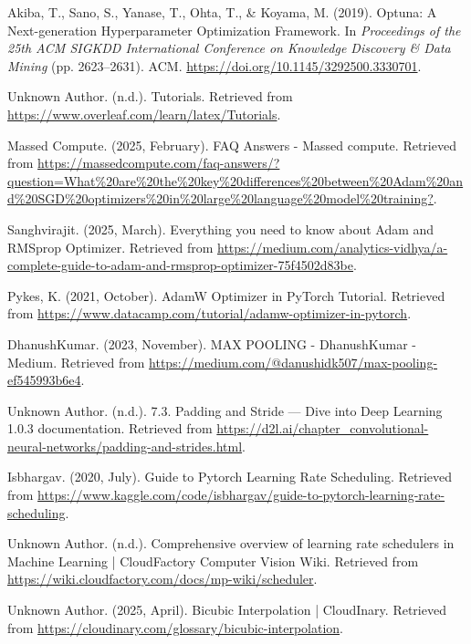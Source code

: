 \documentclass[twocolumn]{article}
\begin{document}
\begin{thebibliography}{99}
     Akiba, T., Sano, S., Yanase, T., Ohta, T., \& Koyama, M. (2019). Optuna: A Next-generation Hyperparameter Optimization Framework. In \textit{Proceedings of the 25th ACM SIGKDD International Conference on Knowledge Discovery \& Data Mining} (pp. 2623–2631). ACM. \url{https://doi.org/10.1145/3292500.3330701}.
    
     Unknown Author. (n.d.). Tutorials. Retrieved from \url{https://www.overleaf.com/learn/latex/Tutorials}.
    
     Massed Compute. (2025, February). FAQ Answers - Massed compute. Retrieved from \url{https://massedcompute.com/faq-answers/?question=What%20are%20the%20key%20differences%20between%20Adam%20and%20SGD%20optimizers%20in%20large%20language%20model%20training?}.
    
     Sanghvirajit. (2025, March). Everything you need to know about Adam and RMSprop Optimizer. Retrieved from \url{https://medium.com/analytics-vidhya/a-complete-guide-to-adam-and-rmsprop-optimizer-75f4502d83be}.
    
     Pykes, K. (2021, October). AdamW Optimizer in PyTorch Tutorial. Retrieved from \url{https://www.datacamp.com/tutorial/adamw-optimizer-in-pytorch}.
    
     DhanushKumar. (2023, November). MAX POOLING - DhanushKumar - Medium. Retrieved from \url{https://medium.com/@danushidk507/max-pooling-ef545993b6e4}.
    
     Unknown Author. (n.d.). 7.3. Padding and Stride — Dive into Deep Learning 1.0.3 documentation. Retrieved from \url{https://d2l.ai/chapter_convolutional-neural-networks/padding-and-strides.html}.
    
     Isbhargav. (2020, July). Guide to Pytorch Learning Rate Scheduling. Retrieved from \url{https://www.kaggle.com/code/isbhargav/guide-to-pytorch-learning-rate-scheduling}.
    
     Unknown Author. (n.d.). Comprehensive overview of learning rate schedulers in Machine Learning | CloudFactory Computer Vision Wiki. Retrieved from \url{https://wiki.cloudfactory.com/docs/mp-wiki/scheduler}.
    
     Unknown Author. (2025, April). Bicubic Interpolation | CloudInary. Retrieved from \url{https://cloudinary.com/glossary/bicubic-interpolation}.
    

\end{thebibliography}
\end{document}
